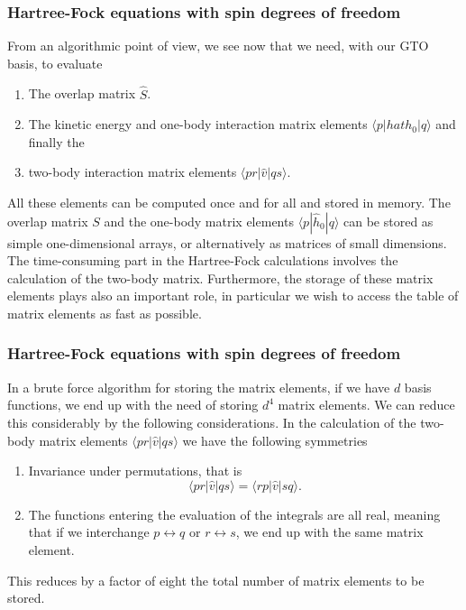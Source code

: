 \frame
{
  \frametitle{Hartree-Fock equations with spin degrees of freedom}
\begin{small}
{\scriptsize
From an algorithmic point of view, we see now that we need, with our GTO basis, to evaluate 
\begin{enumerate}
\item The overlap matrix $\hat{S}$.
\item The kinetic energy and one-body interaction matrix elements $\langle p|hat{h}_0|q\rangle $ and finally the
\item two-body interaction matrix elements $\langle pr | \hat{v}|qs\rangle$.
\end{enumerate}
All these elements can be computed once and for all and stored in
memory. The overlap matrix $S$ and the one-body matrix elements
$\langle p|\hat{h}_0|q\rangle $ can be stored as simple
one-dimensional arrays, or alternatively as matrices of small
dimensions.  The time-consuming part in the Hartree-Fock calculations
involves the calculation of the two-body matrix. Furthermore, the
storage of these matrix elements plays also an important role, in
particular we wish to access the table of matrix elements as fast as
possible.  
}
\end{small}
}

\frame
{
  \frametitle{Hartree-Fock equations with spin degrees of freedom}
\begin{small}
{\scriptsize
In a brute force algorithm for storing the matrix elements, if we have $d$ basis functions, we end up with the need of storing 
$d^4$ matrix elements. We can reduce this considerably by the following considerations.
In the calculation of the two-body matrix elements $\langle pr | \hat{v}|qs\rangle$ we have the following symmetries
\begin{enumerate}
\item Invariance under permutations, that is
\[
\langle pr | \hat{v}|qs\rangle = \langle rp | \hat{v}|sq\rangle.
\]
\item  The functions entering the evaluation of the integrals are all real, meaning that if we interchange $p\leftrightarrow q$ or 
$r\leftrightarrow s$, we end up with the same matrix element.
\end{enumerate}
This reduces by a factor of eight the total number of matrix elements to be stored. 
}
\end{small}
}











